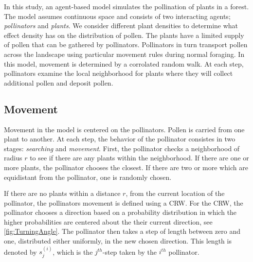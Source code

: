 In this study, an agent-based model simulates the pollination of plants in a
forest. The model assumes continuous space and consists of two interacting
agents; \emph{pollinators} and \emph{plants}.  We consider different plant
densities to determine what effect density has on the distribution of pollen.
The plants have a limited supply of pollen that can be gathered by pollinators.
Pollinators in turn transport pollen across the landscape using particular
movement rules during normal foraging.  In this model, movement is determined by
a corrolated random walk.  At each step, pollinators examine the local
neighborhood for plants where they will collect additional pollen and deposit
pollen.

\subsection{Movement}
Movement in the model is centered on the pollinators.  Pollen is carried from
one plant to another.  At each step, the behavior of the pollinator consistes in
two stages: \emph{searching} and \emph{movement}.  First, the pollinator checks
a neighborhood of radius $r$ to see if there are any plants within the
neighborhood.  If there are one or more plants, the pollinator chooses the
closest.  If there are two or more which are equidistant from the pollinator,
one is randomly chosen.

If there are no plants within a distance $r$, from the current location of the
pollinator, the pollinators movement is defined using a CRW.  For the CRW, the
pollinator chooses a direction based on a probability distribution in which the
higher probabilities are centered about the their current direction, see
\autoref{fig:TurningAngle}.  The pollinator then takes a step of length between
zero and one, distributed either uniformly, in the new chosen direction.  This length is
denoted by $s_j^{(i)}$, which is the $j^{th}$-step taken by the $i^{th}$
pollinator.

